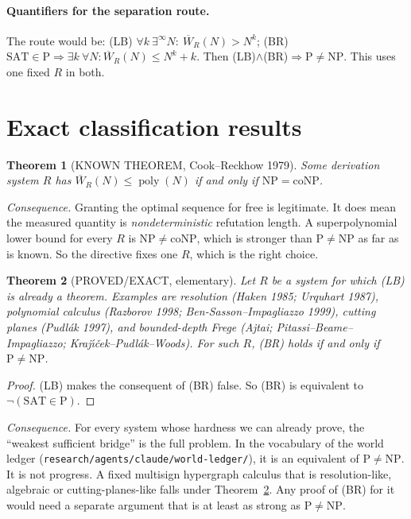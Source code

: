 \documentclass[11pt]{article}
\newtheorem{theorem}{Theorem}
\theoremstyle{definition}
\newcommand{\Wb}{\overline W}
\newcommand{\poly}{\operatorname{poly}}
\begin{document}
\paragraph{Quantifiers for the separation route.}
The route would be: (LB) $\forall k\ \exists^\infty N:\ \Wb_R(N)>N^k$; (BR)
$\mathrm{SAT}\in\mathrm{P}\Rightarrow\exists k\ \forall N:\Wb_R(N)\le N^k+k$. Then
(LB)$\wedge$(BR)$\Rightarrow\mathrm{P}\ne\mathrm{NP}$. This uses one fixed $R$ in both.

\section{Exact classification results}
\begin{theorem}[KNOWN THEOREM, Cook--Reckhow 1979]\label{thm:cr}
Some derivation system $R$ has $\Wb_R(N)\le\poly(N)$ if and only if
$\mathrm{NP}=\mathrm{coNP}$.
\end{theorem}
\noindent\emph{Consequence.} Granting the optimal sequence for free is legitimate.
It does mean the measured quantity is \emph{nondeterministic} refutation length. A
superpolynomial lower bound for every $R$ is $\mathrm{NP}\ne\mathrm{coNP}$, which is
stronger than $\mathrm{P}\ne\mathrm{NP}$ as far as is known. So the directive fixes one
$R$, which is the right choice.

\begin{theorem}[PROVED/EXACT, elementary]\label{thm:reform}
Let $R$ be a system for which (LB) is already a theorem. Examples are resolution (Haken
1985; Urquhart 1987), polynomial calculus (Razborov 1998; Ben-Sasson--Impagliazzo 1999),
cutting planes (Pudl\'ak 1997), and bounded-depth Frege (Ajtai; Pitassi--Beame--Impagliazzo;
Kraj\'{\i}\v{c}ek--Pudl\'ak--Woods). For such $R$, (BR) holds if and only if
$\mathrm{P}\ne\mathrm{NP}$.
\end{theorem}
\begin{proof}
(LB) makes the consequent of (BR) false. So (BR) is equivalent to
$\neg(\mathrm{SAT}\in\mathrm{P})$.
\end{proof}
\noindent\emph{Consequence.} For every system whose hardness we can already prove, the
``weakest sufficient bridge'' is the full problem. In the vocabulary of the world ledger
(\texttt{research/agents/claude/world-ledger/}), it is an equivalent of $\mathrm{P}\ne\mathrm{NP}$.
It is not progress. A fixed multisign hypergraph calculus that is resolution-like,
algebraic or cutting-planes-like falls under Theorem~\ref{thm:reform}. Any proof of (BR)
for it would need a separate argument that is at least as strong as $\mathrm{P}\ne\mathrm{NP}$.
\end{document}
